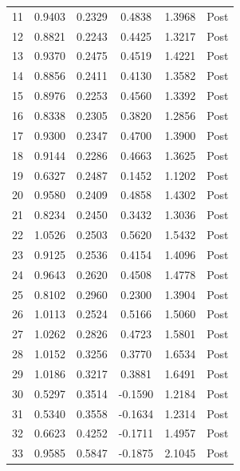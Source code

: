 \documentclass[bibtex]{article}
\begin{document}
{\begin{longtable}{cccccc}
11 & 0.9403 & 0.2329 & 0.4838 & 1.3968 & Post \\
12 & 0.8821 & 0.2243 & 0.4425 & 1.3217 & Post \\
13 & 0.9370 & 0.2475 & 0.4519 & 1.4221 & Post \\
14 & 0.8856 & 0.2411 & 0.4130 & 1.3582 & Post \\
15 & 0.8976 & 0.2253 & 0.4560 & 1.3392 & Post \\
16 & 0.8338 & 0.2305 & 0.3820 & 1.2856 & Post \\
17 & 0.9300 & 0.2347 & 0.4700 & 1.3900 & Post \\
18 & 0.9144 & 0.2286 & 0.4663 & 1.3625 & Post \\
19 & 0.6327 & 0.2487 & 0.1452 & 1.1202 & Post \\
20 & 0.9580 & 0.2409 & 0.4858 & 1.4302 & Post \\
21 & 0.8234 & 0.2450 & 0.3432 & 1.3036 & Post \\
22 & 1.0526 & 0.2503 & 0.5620 & 1.5432 & Post \\
23 & 0.9125 & 0.2536 & 0.4154 & 1.4096 & Post \\
24 & 0.9643 & 0.2620 & 0.4508 & 1.4778 & Post \\
25 & 0.8102 & 0.2960 & 0.2300 & 1.3904 & Post \\
26 & 1.0113 & 0.2524 & 0.5166 & 1.5060 & Post \\
27 & 1.0262 & 0.2826 & 0.4723 & 1.5801 & Post \\
28 & 1.0152 & 0.3256 & 0.3770 & 1.6534 & Post \\
29 & 1.0186 & 0.3217 & 0.3881 & 1.6491 & Post \\
30 & 0.5297 & 0.3514 & -0.1590 & 1.2184 & Post \\
31 & 0.5340 & 0.3558 & -0.1634 & 1.2314 & Post \\
32 & 0.6623 & 0.4252 & -0.1711 & 1.4957 & Post \\
33 & 0.9585 & 0.5847 & -0.1875 & 2.1045 & Post \\
\end{longtable}

}
\end{document}
